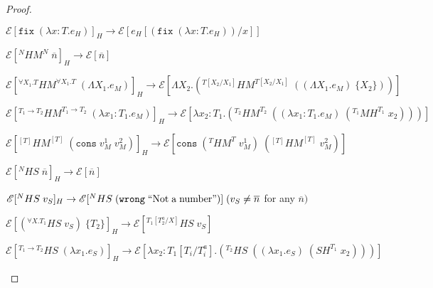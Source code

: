 \begin{hpn}
\begin{proof}
\begin{hpn-case-8}
\end{hpn-case-8}
\begin{hpn-case-9}
$\mathscr{E}[\mathtt{fix}\;(\lambda x:T.e_{H})]_{H}\rightarrow\mathscr{E}[e_{H}[(\mathtt{fix}\;(\lambda x:T.e_{H}))/x]]$

\end{hpn-case-9}
\begin{hpn-case-10}
$\mathscr{E}[^{N}HM^{N}\;\overline{n}]_{H}\rightarrow\mathscr{E}[\overline{n}]$

\end{hpn-case-10}
\begin{hpn-case-11}
$\mathscr{E}[^{\forall X_{1}.T}HM^{\forall X_{1}.T}\;(\Lambda X_{1}.e_{M})]_{H}\rightarrow\mathscr{E}[\Lambda X_{2}.(^{T[X_{2}/X_{1}]}HM^{T[X_{2}/X_{1}]}\;((\Lambda X_{1}.e_{M})\;\lbrace X_{2}\rbrace))]$


\end{hpn-case-11}
\begin{hpn-case-12}
$\mathscr{E}[^{T_{1}\rightarrow T_{2}}HM^{T_{1}\rightarrow T_{2}}\;(\lambda x_{1}:T_{1}.e_{M})]_{H}\rightarrow\mathscr{E}[\lambda x_{2}:T_{1}.(^{T_{2}}HM^{T_{2}}\;((\lambda x_{1}:T_{1}.e_{M})\;(^{T_{1}}MH^{T_{1}}\;x_{2})))]$

\end{hpn-case-12}
\begin{hpn-case-13}
$\mathscr{E}[^{[T]}HM^{[T]}\;(\mathtt{cons}\;v_{M}^{1}\;v_{M}^{2})]_{H}\rightarrow\mathscr{E}[\mathtt{cons}\;(^{T}HM^{T}\;v_{M}^{1})\;(^{[T]}HM^{[T]}\;v_{M}^{2})]$

\end{hpn-case-13}
\begin{hpn-case-14}
$\mathscr{E}[^{N}HS\;\overline{n}]_{H}\rightarrow\mathscr{E}[\overline{n}]$

\end{hpn-case-14}
\begin{hpn-case-15}
$\mathscr{E}[^{N}HS\;v_{S}]_{H}\rightarrow\mathscr{E}[^{N}HS\;(\mathtt{wrong}\;\mathrm{``Not\;a\;number"})]\;(v_{S}\neq\overline{n}$ for any $\overline{n})$

\end{hpn-case-15}
\begin{hpn-case-16}
$\mathscr{E}[(^{\forall X.T_{1}}HS\;v_{S})\;\lbrace T_{2}\rbrace]_{H}\rightarrow\mathscr{E}[^{T_{1}[T^{a}_{2}/X]}HS\;v_{S}]$

\end{hpn-case-16}
\begin{hpn-case-17}
$\mathscr{E}[^{T_{1}\rightarrow T_{2}}HS\;(\lambda x_{1}.e_{S})]_{H}\rightarrow\mathscr{E}[\lambda x_{2}:T_{1}[T_{i}/T^{a}_{i}].(^{T_{2}}HS\;((\lambda x_{1}.e_{S})\;(SH^{T_{1}}\;x_{2})))]$


\end{hpn-case-17}
\end{proof}
\end{hpn}
